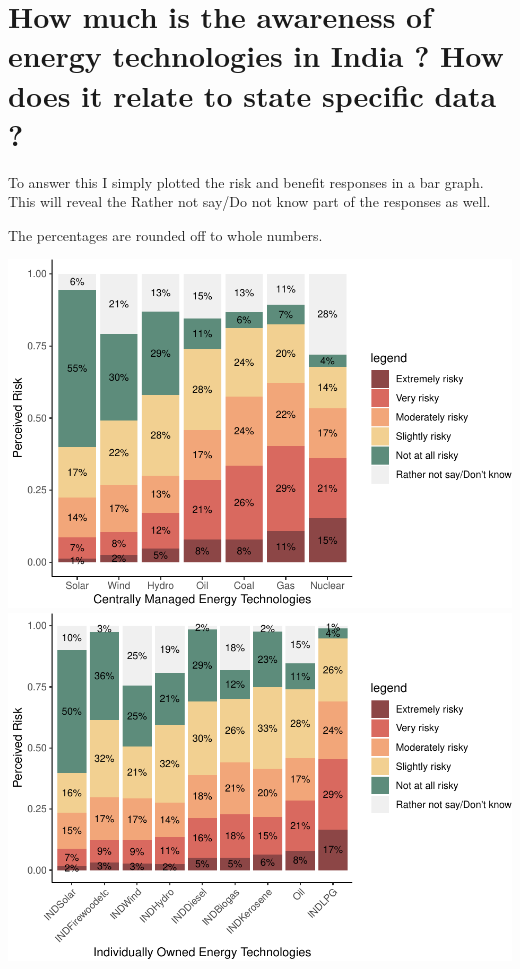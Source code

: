 \documentclass[
]{article}
\begin{document}
\newpage

\hypertarget{how-much-is-the-awareness-of-energy-technologies-in-india-how-does-it-relate-to-state-specific-data}{%
\section{How much is the awareness of energy technologies in India ? How
does it relate to state specific data
?}\label{how-much-is-the-awareness-of-energy-technologies-in-india-how-does-it-relate-to-state-specific-data}}

To answer this I simply plotted the risk and benefit responses in a bar
graph. This will reveal the Rather not say/Do not know part of the
responses as well.

The percentages are rounded off to whole numbers.

\includegraphics{Significant_results_files/figure-latex/unnamed-chunk-6-1.pdf}
\includegraphics{Significant_results_files/figure-latex/unnamed-chunk-6-2.pdf}
\end{document}
